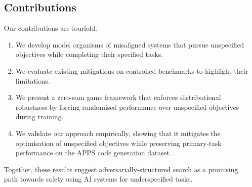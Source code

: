 \subsection{Contributions}

Our contributions are fourfold. 
\begin{enumerate}
    \item We develop model organisms of misaligned systems that pursue unspecified objectives while completing their specified tasks.
    \item We evaluate existing mitigations on controlled benchmarks to highlight their limitations.
    \item We present a zero-sum game framework that enforces distributional robustness by forcing randomised performance over unspecified objectives during training.
    \item We validate our approach empirically, showing that it mitigates the optimisation of unspecified objectives while preserving primary-task performance on the APPS code generation dataset.
\end{enumerate}

Together, these results suggest adversarially-structured search as a promising path towards safety using AI systems for underspecified tasks.

%  
